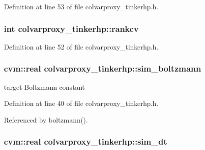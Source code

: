 Definition at line 53 of file colvarproxy\-\_\-tinkerhp.\-h.

\hypertarget{classcolvarproxy__tinkerhp_a5db0b78cc2d62920b9969b3e6bee8f6a}{
\subsubsection[{rankcv}]{\setlength{\rightskip}{0pt plus 5cm}int colvarproxy\-\_\-tinkerhp\-::rankcv\hspace{0.3cm}{\ttfamily [private]}}}\label{classcolvarproxy__tinkerhp_a5db0b78cc2d62920b9969b3e6bee8f6a}


Definition at line 52 of file colvarproxy\-\_\-tinkerhp.\-h.

\hypertarget{classcolvarproxy__tinkerhp_a0bd848796b227c5518d18e4e92595b1f}{
\subsubsection[{sim\-\_\-boltzmann}]{\setlength{\rightskip}{0pt plus 5cm}cvm\-::real colvarproxy\-\_\-tinkerhp\-::sim\-\_\-boltzmann\hspace{0.3cm}{\ttfamily [private]}}}\label{classcolvarproxy__tinkerhp_a0bd848796b227c5518d18e4e92595b1f}


target Boltzmann constant 



Definition at line 40 of file colvarproxy\-\_\-tinkerhp.\-h.



Referenced by boltzmann().

\hypertarget{classcolvarproxy__tinkerhp_a29bb1f101010fea6079b4d0045b93389}{
\subsubsection[{sim\-\_\-dt}]{\setlength{\rightskip}{0pt plus 5cm}cvm\-::real colvarproxy\-\_\-tinkerhp\-::sim\-\_\-dt\hspace{0.3cm}{\ttfamily [private]}}}\label{classcolvarproxy__tinkerhp_a29bb1f101010fea6079b4d0045b93389}


